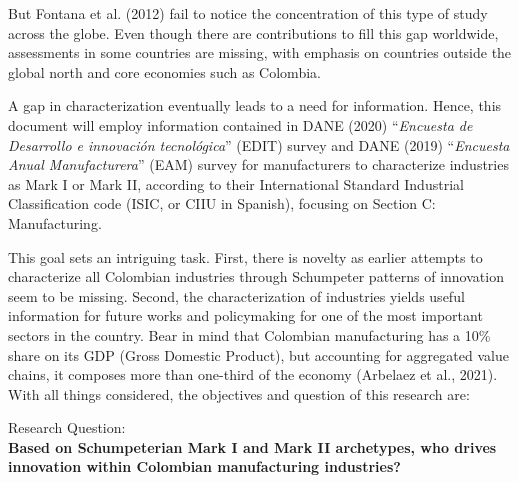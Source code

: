 \documentclass[12pt,a4paper]{article}
\begin{document}
But Fontana et al. (2012) fail to notice the concentration of this type of study across the globe. Even though there are contributions to fill this gap worldwide, assessments in some countries are missing, with emphasis on countries outside the global north and core economies such as Colombia.   

A gap in characterization eventually leads to a need for information. Hence, this document will employ information contained in DANE (2020) “\textit{Encuesta de Desarrollo e innovación tecnológica}” (EDIT) survey and DANE (2019) “\textit{Encuesta Anual Manufacturera}” (EAM) survey for manufacturers to characterize industries as Mark I or Mark II, according to their International Standard Industrial Classification code (ISIC, or CIIU in Spanish), focusing on Section C: Manufacturing.  

This goal sets an intriguing task. First, there is novelty as earlier attempts to characterize all Colombian industries through Schumpeter patterns of innovation seem to be missing. Second, the characterization of industries yields useful information for future works and policymaking for one of the most important sectors in the country. Bear in mind that Colombian manufacturing has a 10\% share on its GDP (Gross Domestic Product), but accounting for aggregated value chains, it composes more than one-third of the economy (Arbelaez et al., 2021). With all things considered, the objectives and question of this research are: 



\begin{center}
	Research Question: \\  \textbf{Based on Schumpeterian Mark I and Mark II archetypes, who drives innovation within Colombian manufacturing industries?}
\end{center}
\end{document}
